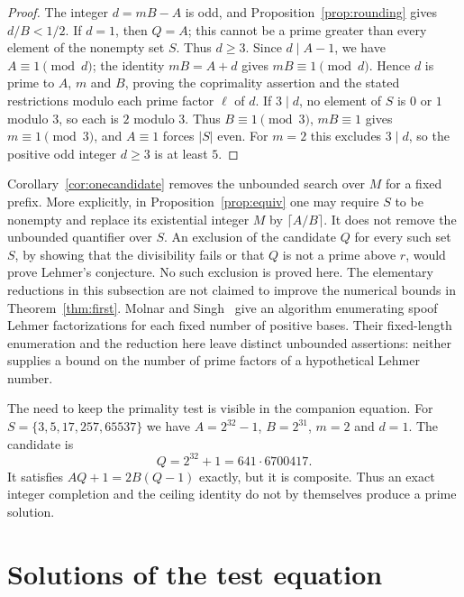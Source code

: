\documentclass[11pt,reqno]{amsart}
\numberwithin{equation}{section}
\theoremstyle{plain}
\theoremstyle{definition}
\theoremstyle{remark}
\begin{document}
\begin{proof}
The integer $d=mB-A$ is odd, and Proposition~\ref{prop:rounding}
gives $d/B<1/2$. If $d=1$, then $Q=A$; this cannot be a prime
greater than every element of the nonempty set $S$. Thus $d\ge3$.
Since $d\mid A-1$, we have $A\equiv1\pmod d$; the identity
$mB=A+d$ gives $mB\equiv1\pmod d$. Hence $d$ is prime to
$A$, $m$ and $B$, proving the coprimality assertion and the stated
restrictions modulo each prime factor $\ell$ of $d$.
If $3\mid d$, no element of $S$ is $0$ or $1$ modulo $3$, so each
is $2$ modulo $3$. Thus $B\equiv1\pmod3$, $mB\equiv1$ gives
$m\equiv1\pmod3$, and $A\equiv1$ forces $|S|$ even.
For $m=2$ this excludes $3\mid d$, so the positive odd integer
$d\ge3$ is at least $5$.
\end{proof}

Corollary~\ref{cor:onecandidate} removes the unbounded search over
$M$ for a fixed prefix. More explicitly, in
Proposition~\ref{prop:equiv} one may require $S$ to be nonempty and
replace its existential integer $M$ by $\lceil A/B\rceil$.
It does not remove the unbounded quantifier over $S$.
An exclusion of the candidate $Q$ for every such set $S$, by showing
that the divisibility fails or that $Q$ is not a prime above $r$,
would prove Lehmer's conjecture. No such exclusion is proved here.
The elementary reductions in this subsection are not claimed to
improve the numerical bounds in Theorem~\ref{thm:first}.
Molnar and Singh~\cite{MS26} give an algorithm enumerating spoof
Lehmer factorizations for each fixed number of positive bases.
Their fixed-length enumeration and the reduction here leave distinct
unbounded assertions: neither supplies a bound on the number of
prime factors of a hypothetical Lehmer number.

The need to keep the primality test is visible in the companion
equation. For $S=\{3,5,17,257,65537\}$ we have
$A=2^{32}-1$, $B=2^{31}$, $m=2$ and $d=1$. The candidate is
\[
 Q=2^{32}+1=641\cdot6700417.
\]
It satisfies $AQ+1=2B(Q-1)$ exactly, but it is composite.
Thus an exact integer completion and the ceiling identity do not
by themselves produce a prime solution.

\appendix
\section{Solutions of the test equation}\label{app:tests}
\end{document}
